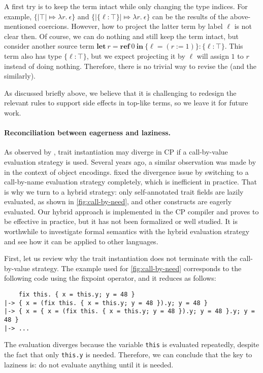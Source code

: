 A first try is to keep the term intact while only changing the type indices. For
example, $\{|\top| \Mapsto \lambda r.\ \epsilon\}$ and $\{|\{\ell:\top\}|
\Mapsto \lambda r.\ \epsilon\}$ can be the results of the above-mentioned
coercions. However, how to project the latter term by label $\ell$ is not clear
then. Of course, we can do nothing and still keep the term intact, but consider
another source term $\mathbf{let}\ r = \mathbf{ref}\ 0\ \mathbf{in}\ \{\ell = (r
:= 1)\} : \{\ell:\top\}$. This term also has type $\{\ell:\top\}$, but we expect
projecting it by $\ell$ will assign $1$ to $r$ instead of doing nothing.
Therefore, there is no trivial way to revise the  (and the
 similarly).

As discussed briefly above, we believe that it is challenging to redesign the
relevant rules to support side effects in top-like terms, so we leave it for
future work.

\paragraph{Reconciliation between eagerness and laziness.}
As observed by \citet{fan2022direct}, trait instantiation may diverge in CP if a
call-by-value evaluation strategy is used. Several years ago, a
similar observation was made by \citet{bruce1999comparing} in the context of
object encodings. \citeauthor{fan2022direct} fixed the divergence issue by
switching to a call-by-name evaluation strategy completely, which is inefficient
in practice. That is why we turn to a hybrid strategy: only self-annotated trait
fields are lazily evaluated, as shown in \autoref{fig:call-by-need}, and other
constructs are eagerly evaluated. Our hybrid approach is implemented in the CP
compiler and proves to be effective in practice, but it has not been formalized
or well studied. It is worthwhile to investigate formal semantics with the
hybrid evaluation strategy and see how it can be applied to other languages.

First, let us review why the trait instantiation does not terminate with the
call-by-value strategy. The example used for \autoref{fig:call-by-need}
corresponds to the following code using the fixpoint operator, and it reduces as
follows:
\begin{lstlisting}
    fix this. { x = this.y; y = 48 }
|-> { x = (fix this. { x = this.y; y = 48 }).y; y = 48 }
|-> { x = { x = (fix this. { x = this.y; y = 48 }).y; y = 48 }.y; y = 48 }
|-> ...
\end{lstlisting}
The evaluation diverges because the variable \lstinline{this} is evaluated
repeatedly, despite the fact that only \lstinline{this.y} is needed. Therefore,
we can conclude that the key to laziness is: do not evaluate anything until it
is needed.

